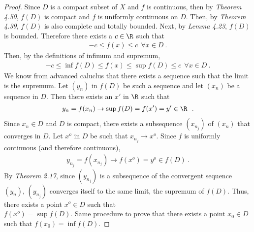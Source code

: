 \begin{questions}


\begin{solution}
  \begin{proof}
  Since $D$ is a compact subset of $X$ and $f$ is continuous, then by \textit{Theorem 4.50}, $f(D)$ is compact and $f$ is uniformly continuous on $D$. Then, by \textit{Theorem 4.39}, $f(D)$ is also complete and totally bounded. Next, by \textit{Lemma 4.23}, $f(D)$ is bounded. Therefore there exists a $c\in\R$ such that
  \begin{align*}
  -c\leq f(x)\leq c~~\forall x\in D~.
  \end{align*}
  Then, by the definitions of infimum and supremum,
  \begin{align*}
  -c\leq\inf f(D)\leq f(x)\leq\sup f(D)\leq c~~\forall x\in D~.  
  \end{align*}
  We know from advanced caluclus that there exists a sequence such that the limit is the supremum. Let $(y_n)$ in $f(D)$ be such a sequence and let $(x_n)$ be a sequence in $D$. Then there exists an $x'$ in $\R$ such that
  \begin{align*}
	y_n=f(x_n)\rightarrow\sup f(D)= f(x')=y'\in \R~~.
\end{align*}
Since $x_n\in D$ and $D$ is compact, there exists a subsequence $(x_{n_j})$ of $(x_n)$ that converges in $D$. Let $x^o$ in $D$ be such that $x_{n_j}\rightarrow x^o$. Since $f$ is uniformly continuous (and therefore continuous),
\begin{align*}
y_{n_j}=f(x_{n_j})\rightarrow f(x^o)=y^o\in f(D)~.
\end{align*}
By \textit{Theorem 2.17}, since $(y_{n_j})$ is a subsequence of the convergent sequence $(y_n)$, $(y_{n_j})$ converges itself to the same limit, the supremum of $f(D)$. Thus, there exists a point $x^o\in D$ such that\\ $f(x^o)=\sup f(D)$. Same procedure to prove that there exists a point $x_0\in D$ such that $f(x_0)=\inf f(D)$.
\end{proof}
\end{solution}
\end{questions}